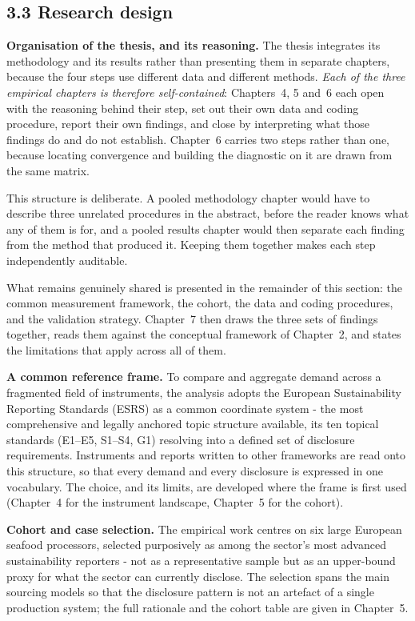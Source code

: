 \documentclass[
]{article}
\begin{document}
\subsection{3.3 Research design}\label{methodology}

\textbf{Organisation of the thesis, and its reasoning.} The thesis integrates
its methodology and its results rather than presenting them in separate
chapters, because the four steps use different data and different methods.
\emph{Each of the three empirical chapters is therefore self-contained}: Chapters~4, 5 and~6 each open with
the reasoning behind their step, set out their own data and coding procedure,
report their own findings, and close by interpreting what those findings do and
do not establish. Chapter~6 carries two steps rather than one, because
locating convergence and building the diagnostic on it are drawn from the same
matrix.

This structure is deliberate. A pooled methodology chapter would have to
describe three unrelated procedures in the abstract, before the reader knows what
any of them is for, and a pooled results chapter would then separate each finding
from the method that produced it. Keeping them together makes each step
independently auditable.

What remains genuinely shared is presented in the remainder of this section: the
common measurement framework, the cohort, the data and coding procedures, and the
validation strategy. Chapter~7 then draws the three sets of findings together, reads them
against the conceptual framework of Chapter~2, and states the limitations that
apply across all of them.

\textbf{A common reference frame.} To compare and aggregate demand across a
fragmented field of instruments, the analysis adopts the European Sustainability
Reporting Standards (ESRS) as a common coordinate system - the most comprehensive
and legally anchored topic structure available, its ten topical standards (E1--E5,
S1--S4, G1) resolving into a defined set of disclosure requirements. Instruments and
reports written to other frameworks are read onto this structure, so that every
demand and every disclosure is expressed in one vocabulary. The choice, and its
limits, are developed where the frame is first used (Chapter~4 for the instrument
landscape, Chapter~5 for the cohort).

\textbf{Cohort and case selection.} The empirical work centres on six large
European seafood processors, selected purposively as among the sector's most advanced
sustainability reporters - not as a representative sample but as an upper-bound
proxy for what the sector can currently disclose. The selection spans the main
sourcing models so that the disclosure pattern is not an artefact of a single
production system; the full rationale and the cohort table are given in Chapter~5.
\end{document}
